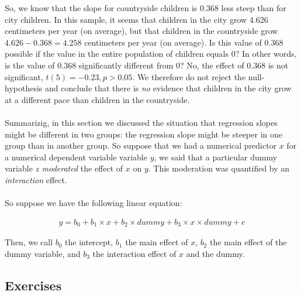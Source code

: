 So, we know that the slope for countryside children is 0.368 less steep than for city children. In this sample, it seems that children in the city grow 4.626 centimeters per year (on average), but that children in the countryside grow $4.626-0.368= 4.258$ centimeters per year (on average). Is this value of 0.368 possible if the value in the entire population of children equals 0? In other words, is the value of 0.368 significantly different from 0? No, the effect of 0.368 is not significant, $t(5)=-0.23, p>0.05$. We therefore do not reject the null-hypothesis and conclude that there is \textit{no} evidence that children in the city grow at a different pace than children in the countryside.\\
\\
Summarizig, in this section we discussed the situation that regression slopes might be different in two groups: the regression slope might be steeper in one group than in another group. So suppose that we had a numerical predictor $x$ for a numerical dependent variable variable $y$, we said that a particular dummy variable $z$ \textit{moderated} the effect of $x$ on $y$. This moderation was quantified by an \textit{interaction} effect.
\\
\\
So suppose we have the following linear equation:


\begin{eqnarray} 
y =  b_0 + b_1  \times x + b_2  \times dummy +b_3 \times x \times dummy + e \nonumber
\end{eqnarray}

Then, we call $b_0$ the intercept, $b_1$ the main effect of $x$, $b_2$ the main effect of the dummy variable, and $b_3$ the interaction effect of $x$ and the dummy. 


\subsection{Exercises}

